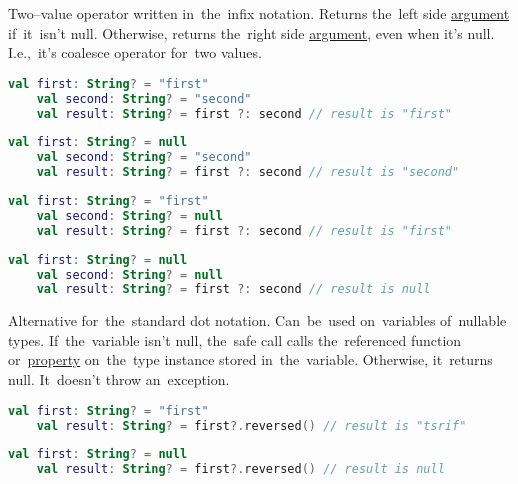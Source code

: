 Two--value operator written in~the~infix notation.
Returns the~left side \hyperref[parameterargument]{argument} if~it~isn't null.
Otherwise, returns the~right side \hyperref[parameterargument]{argument}, even when it's null.
I.e.,~it's coalesce operator for~two values.

\begin{lstlisting}[language=Kotlin]
    val first: String? = "first"
    val second: String? = "second"
    val result: String? = first ?: second // result is "first"
\end{lstlisting}

\begin{lstlisting}[language=Kotlin]
    val first: String? = null
    val second: String? = "second"
    val result: String? = first ?: second // result is "second"
\end{lstlisting}
\newpage

\begin{lstlisting}[language=Kotlin]
    val first: String? = "first"
    val second: String? = null
    val result: String? = first ?: second // result is "first"
\end{lstlisting}

\begin{lstlisting}[language=Kotlin]
    val first: String? = null
    val second: String? = null
    val result: String? = first ?: second // result is null
\end{lstlisting}

\label{kotlinsafecall}
Alternative for~the~standard dot notation.
Can~be~used on~variables of~nullable types.
If~the~variable isn't null, the~safe call calls the~referenced function or~\hyperref[variablefieldproperty]{property} on~the~type instance stored in~the~variable.
Otherwise, it~returns null.
It~doesn't throw an~exception.

\begin{lstlisting}[language=Kotlin]
    val first: String? = "first"
    val result: String? = first?.reversed() // result is "tsrif"
\end{lstlisting}

\begin{lstlisting}[language=Kotlin]
    val first: String? = null
    val result: String? = first?.reversed() // result is null
\end{lstlisting}

